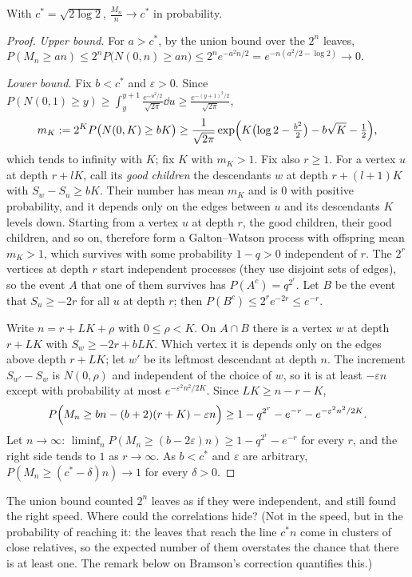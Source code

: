 \begin{theorem}\label{thm:brwspeed}
With $c^*=\sqrt{2\log2}$, $\frac{M_n}n\to c^*$ in probability.
\end{theorem}

\begin{proof}
\emph{Upper bound.} For $a>c^*$, by the union bound over the $2^n$ leaves, $P(M_n\ge an)\le2^nP\bigl(N(0,n)\ge an\bigr)\le2^ne^{-a^2n/2}=e^{-n(a^2/2-\log2)}\to0$.

\emph{Lower bound.} Fix $b<c^*$ and $\varepsilon>0$. Since $P(N(0,1)\ge y)\ge\int_y^{y+1}\frac{e^{-u^2/2}}{\sqrt{2\pi}}\dd u\ge\frac{e^{-(y+1)^2/2}}{\sqrt{2\pi}}$,
\[
m_K:=2^KP\bigl(N(0,K)\ge bK\bigr)\ge\frac1{\sqrt{2\pi}}\exp\Bigl(K\bigl(\log2-\tfrac{b^2}2\bigr)-b\sqrt K-\tfrac12\Bigr),
\]
which tends to infinity with $K$; fix $K$ with $m_K>1$. Fix also $r\ge1$. For a vertex $u$ at depth $r+lK$, call its \emph{good children} the descendants $w$ at depth $r+(l+1)K$ with $S_w-S_u\ge bK$. Their number has mean $m_K$ and is $0$ with positive
probability, and it depends only on the edges between $u$ and its descendants $K$ levels down. Starting from a vertex $u$ at depth $r$, the good children, their good children, and so on, therefore form a Galton--Watson process with
offspring mean $m_K>1$, which survives with some probability $1-q>0$ independent of $r$. The $2^r$ vertices at depth $r$ start independent processes (they use disjoint sets of edges), so the event $A$ that one of them survives has
$P(A^c)=q^{2^r}$. Let $B$ be the event that $S_u\ge-2r$ for all $u$ at depth $r$; then $P(B^c)\le2^re^{-2r}\le e^{-r}$.

Write $n=r+LK+\rho$ with $0\le\rho<K$. On $A\cap B$ there is a vertex $w$ at depth $r+LK$ with $S_w\ge-2r+bLK$. Which vertex it is depends only on the edges above depth $r+LK$; let $w'$ be its leftmost descendant at depth $n$. The
increment $S_{w'}-S_w$ is $N(0,\rho)$ and independent of the choice of $w$, so it is at least $-\varepsilon n$ except with probability at most $e^{-\varepsilon^2n^2/2K}$. Since $LK\ge n-r-K$,
\[
P\Bigl(M_n\ge bn-(b+2)(r+K)-\varepsilon n\Bigr)\ge1-q^{2^r}-e^{-r}-e^{-\varepsilon^2n^2/2K}.
\]
Let $n\to\infty$: $\liminf_nP(M_n\ge(b-2\varepsilon)n)\ge1-q^{2^r}-e^{-r}$ for every $r$, and the right side tends to $1$ as $r\to\infty$. As $b<c^*$ and $\varepsilon$ are arbitrary, $P(M_n\ge(c^*-\delta)n)\to1$ for every $\delta>0$.
\end{proof}

\begin{think}
The union bound counted $2^n$ leaves as if they were independent, and still found the right speed. Where could the correlations hide? (Not in the speed, but in the probability of reaching it: the leaves that reach the line $c^*n$ come in clusters of close relatives, so the expected number of them overstates the chance that there is at least one. The remark below on Bramson's correction quantifies this.)
\end{think}

